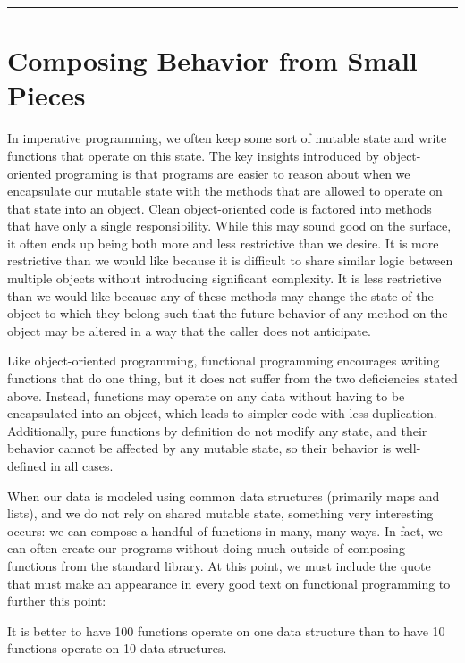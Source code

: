\documentclass[10pt,twoside,openright]{memoir}
\begin{document}
\begin{center}\rule{0.5\linewidth}{0.5pt}\end{center}


\section{Composing Behavior from Small Pieces}

In imperative programming, we often keep some sort of mutable state and
write functions that operate on this state. The key insights introduced
by object-oriented programing is that programs are easier to reason
about when we encapsulate our mutable state with the methods that are
allowed to operate on that state into an object. Clean object-oriented
code is factored into methods that have only a single responsibility.
While this may sound good on the surface, it often ends up being both
more and less restrictive than we desire. It is more restrictive than we
would like because it is difficult to share similar logic between
multiple objects without introducing significant complexity. It is less
restrictive than we would like because any of these methods may change
the state of the object to which they belong such that the future
behavior of any method on the object may be altered in a way that the
caller does not anticipate.

Like object-oriented programming, functional programming encourages
writing functions that do one thing, but it does not suffer from the two
deficiencies stated above. Instead, functions may operate on any data
without having to be encapsulated into an object, which leads to simpler
code with less duplication. Additionally, pure functions by definition
do not modify any state, and their behavior cannot be affected by any
mutable state, so their behavior is well-defined in all cases.

When our data is modeled using common data structures (primarily maps
and lists), and we do not rely on shared mutable state, something very
interesting occurs: we can compose a handful of functions in many, many
ways. In fact, we can often create our programs without doing much
outside of composing functions from the standard library. At this point,
we must include the quote that must make an appearance in every good
text on functional programming to further this point:

\begin{fquote}It is better to have 100 functions operate on one data structure than to have 10 functions operate on 10 data structures.
\end{fquote}
\end{document}
